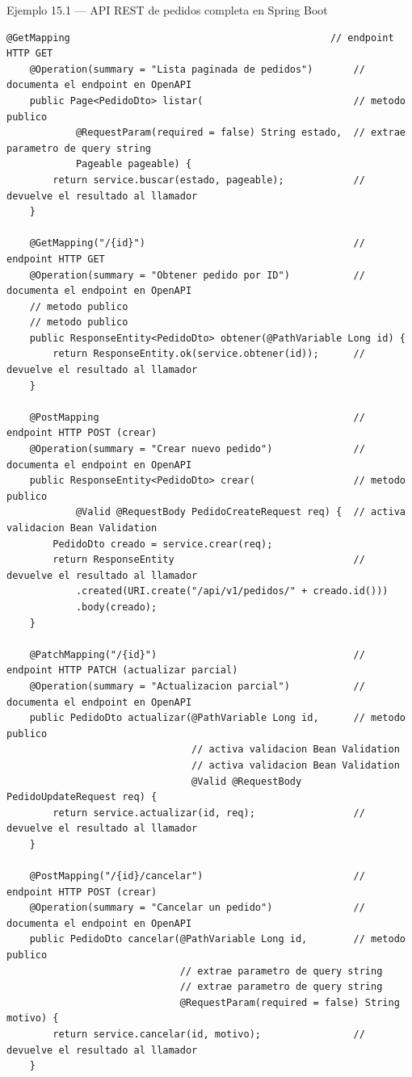 \documentclass[11pt,a4paper,openany]{book}
\begin{document}
\begin{cajaejemplo}{Ejemplo 15.1 --- API REST de pedidos completa en Spring Boot}
\begin{lstlisting}[style=java,caption={PedidoController.java},label=lst:15.2]
    @GetMapping                                             // endpoint HTTP GET
    @Operation(summary = "Lista paginada de pedidos")       // documenta el endpoint en OpenAPI
    public Page<PedidoDto> listar(                          // metodo publico
            @RequestParam(required = false) String estado,  // extrae parametro de query string
            Pageable pageable) {
        return service.buscar(estado, pageable);            // devuelve el resultado al llamador
    }

    @GetMapping("/{id}")                                    // endpoint HTTP GET
    @Operation(summary = "Obtener pedido por ID")           // documenta el endpoint en OpenAPI
    // metodo publico
    // metodo publico
    public ResponseEntity<PedidoDto> obtener(@PathVariable Long id) {
        return ResponseEntity.ok(service.obtener(id));      // devuelve el resultado al llamador
    }

    @PostMapping                                            // endpoint HTTP POST (crear)
    @Operation(summary = "Crear nuevo pedido")              // documenta el endpoint en OpenAPI
    public ResponseEntity<PedidoDto> crear(                 // metodo publico
            @Valid @RequestBody PedidoCreateRequest req) {  // activa validacion Bean Validation
        PedidoDto creado = service.crear(req);
        return ResponseEntity                               // devuelve el resultado al llamador
            .created(URI.create("/api/v1/pedidos/" + creado.id()))
            .body(creado);
    }

    @PatchMapping("/{id}")                                  // endpoint HTTP PATCH (actualizar parcial)
    @Operation(summary = "Actualizacion parcial")           // documenta el endpoint en OpenAPI
    public PedidoDto actualizar(@PathVariable Long id,      // metodo publico
                                // activa validacion Bean Validation
                                // activa validacion Bean Validation
                                @Valid @RequestBody PedidoUpdateRequest req) {
        return service.actualizar(id, req);                 // devuelve el resultado al llamador
    }

    @PostMapping("/{id}/cancelar")                          // endpoint HTTP POST (crear)
    @Operation(summary = "Cancelar un pedido")              // documenta el endpoint en OpenAPI
    public PedidoDto cancelar(@PathVariable Long id,        // metodo publico
                              // extrae parametro de query string
                              // extrae parametro de query string
                              @RequestParam(required = false) String motivo) {
        return service.cancelar(id, motivo);                // devuelve el resultado al llamador
    }


\end{lstlisting}
\end{cajaejemplo}
\end{document}
